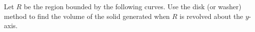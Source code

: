\begin{questions}


\newpage


\question Let $R$ be the region bounded by the following curves. Use the disk (or washer) method to find the volume of the solid generated when $R$ is revolved about the $y$-axis.
\begin{parts}


\end{parts}
\end{questions}
